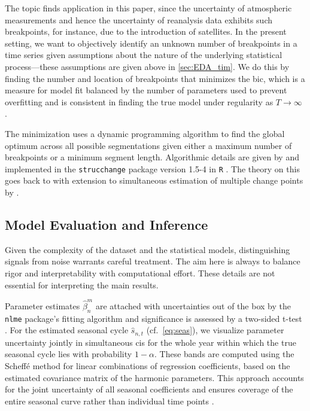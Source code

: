 The topic finds application in this paper, since the uncertainty of atmospheric measurements and hence the uncertainty of reanalysis data exhibits such breakpoints, for instance, due to the introduction of satellites. In the present setting, we want to objectively identify an unknown number of breakpoints in a time series given assumptions about the nature of the underlying statistical process---these assumptions are given above in \cref{sec:EDA_tim}. We do this by finding the number and location of breakpoints that minimizes the \gls{bic}, which is a measure for model fit balanced by the number of parameters used to prevent overfitting and is consistent in finding the true model under regularity as $T \rightarrow \infty$ \parencite{schwarzEstimatingDimensionModel1978}.

The minimization uses a dynamic programming algorithm to find the global optimum across all possible segmentations given either a maximum number of breakpoints or a minimum segment length. Algorithmic details are given by \textcite{zeileisTestingDatingStructural2003} and implemented in the \texttt{strucchange} package version 1.5-4 in \texttt{R} \parencite{zeileisStrucchangePackageTesting2002}. The theory on this goes back to \textcite{baiLeastSquaresEstimation1994} with extension to simultaneous estimation of multiple change points by \textcite{baiEstimatingMultipleBreaks1997, baiComputationAnalysisMultiple2003}.

\subsection{Model Evaluation and Inference}\label{sec:EDA_sig}
Given the complexity of the dataset and the statistical models, distinguishing signals from noise warrants careful treatment. The aim here is always to balance rigor and interpretability with computational effort. These details are not essential for interpreting the main results.

Parameter estimates $\hat{\beta}_n^m$ are attached with uncertainties out of the box by the \texttt{nlme} package's fitting algorithm and significance is assessed by a two-sided t-test \parencite{pinheiroMixedeffectsModelsSPLUS2000}. For the estimated seasonal cycle $\hat{s}_{n,t}$ (cf.~\cref{eq:seas}), we visualize parameter uncertainty jointly in simultaneous \glspl{ci} for the whole year within which the true seasonal cycle lies with probability $1-\alpha$. These bands are computed using the Scheffé method for linear combinations of regression coefficients, based on the estimated covariance matrix of the harmonic parameters. This approach accounts for the joint uncertainty of all seasonal coefficients and ensures coverage of the entire seasonal curve rather than individual time points \parencite{scheffeMethodJudgingAll1953, dickhausSimultaneousStatisticalInference2014}.

